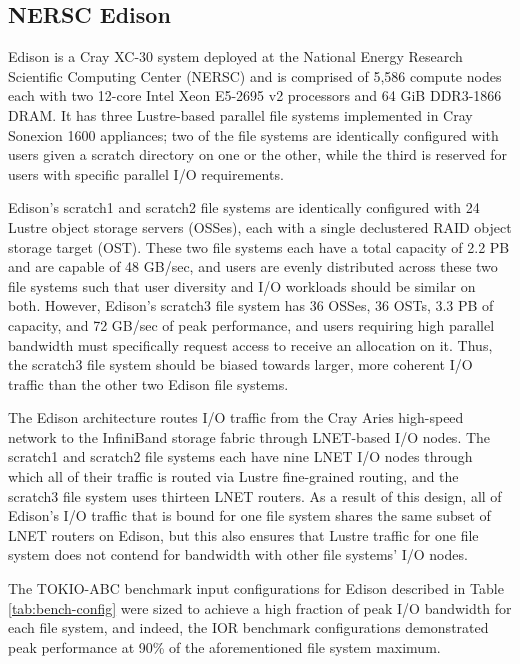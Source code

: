 \subsection{NERSC Edison} \label{sec:platforms/edison}

Edison is a Cray XC-30 system deployed at the National Energy Research Scientific Computing Center (NERSC) and is comprised of 5,586 compute nodes each with two 12-core Intel Xeon E5-2695 v2 processors and 64 GiB DDR3-1866 DRAM.
It has three Lustre-based parallel file systems implemented in Cray Sonexion 1600 appliances; two of the file systems are identically configured with users given a scratch directory on one or the other, while the third is reserved for users with specific parallel I/O requirements.

Edison's scratch1 and scratch2 file systems are identically configured with 24 Lustre object storage servers (OSSes), each with a single declustered RAID object storage target (OST).
These two file systems each have a total capacity of 2.2 PB and are capable of 48 GB/sec, and users are evenly distributed across these two file systems such that user diversity and I/O workloads should be similar on both.
However, Edison's scratch3 file system has 36 OSSes, 36 OSTs, 3.3 PB of capacity, and 72 GB/sec of peak performance, and users requiring high parallel bandwidth must specifically request access to receive an allocation on it.  Thus, the scratch3 file system should be biased towards larger, more coherent I/O traffic than the other two Edison file systems.

The Edison architecture routes I/O traffic from the Cray Aries high-speed network to the InfiniBand storage fabric through LNET-based I/O nodes.
The scratch1 and scratch2 file systems each have nine LNET I/O nodes through which all of their traffic is routed via Lustre fine-grained routing, and the scratch3 file system uses thirteen LNET routers.
As a result of this design, all of Edison's I/O traffic that is bound for one file system shares the same subset of LNET routers on Edison, but this also ensures that Lustre traffic for one file system does not contend for bandwidth with other file systems' I/O nodes.

The TOKIO-ABC benchmark input configurations for Edison described in Table \ref{tab:bench-config} were sized to achieve a high fraction of peak I/O bandwidth for each file system, and indeed, the IOR benchmark configurations demonstrated peak performance at 90\% of the aforementioned file system maximum.

